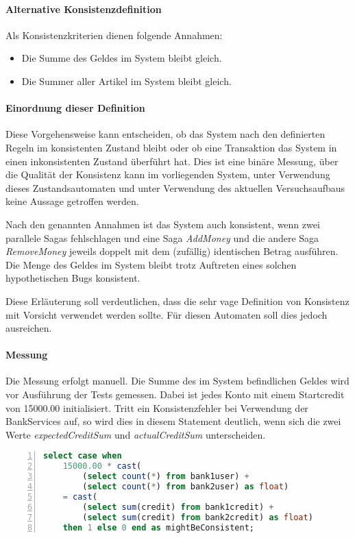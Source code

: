 \paragraph*{Alternative Konsistenzdefinition}\label{par:consistency_definition_alt}
Als Konsistenzkriterien dienen folgende Annahmen:
\begin{itemize}
	\item Die Summe des Geldes im System bleibt gleich.
	\item Die Summer aller Artikel im System bleibt gleich.
\end{itemize}

\paragraph*{Einordnung dieser Definition}
Diese Vorgehensweise kann entscheiden, ob das System nach den definierten Regeln im konsistenten Zustand bleibt oder ob eine Transaktion das System in einen inkonsistenten Zustand überführt hat. Dies ist eine binäre Messung, über die Qualität der Konsistenz kann im vorliegenden System, unter Verwendung dieses Zustandsautomaten und unter Verwendung des aktuellen Versuchsaufbaus keine Aussage getroffen werden. 

Nach den genannten Annahmen ist das System auch konsistent, wenn zwei parallele Sagas fehlschlagen und eine Saga \textit{AddMoney} und die andere Saga \textit{RemoveMoney} jeweils doppelt mit dem (zufällig) identischen Betrag ausführen. Die Menge des Geldes im System bleibt trotz Auftreten eines solchen hypothetischen Bugs konsistent. 

Diese Erläuterung soll verdeutlichen, dass die sehr vage Definition von Konsistenz mit Vorsicht verwendet werden sollte. Für diesen Automaten soll dies jedoch ausreichen. 

\paragraph{Messung}
Die Messung erfolgt manuell. Die Summe des im System befindlichen Geldes wird vor Ausführung der Tests gemessen. Dabei ist jedes Konto mit einem Startcredit von 15000.00 initialisiert. Tritt ein Konsistenzfehler bei Verwendung der BankServices auf, so wird dies in diesem Statement deutlich, wenn sich die zwei Werte \textit{expectedCreditSum} und \textit{actualCreditSum} unterscheiden.

\begin{lstlisting}[language=SQL, breaklines=true, tabsize=2, showstringspaces=false, frame=single, numbers=left, basicstyle=\small] 
select case when 
	15000.00 * cast(
		(select count(*) from bank1user) + 
		(select count(*) from bank2user) as float) 
	= cast(
		(select sum(credit) from bank1credit) + 
		(select sum(credit) from bank2credit) as float)
	then 1 else 0 end as mightBeConsistent;
\end{lstlisting}\label{}

